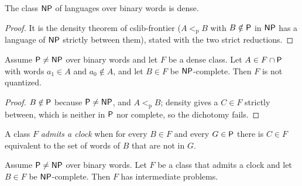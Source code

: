 \begin{theorem}
  \label{thm:structure-denso-np}
  \leanok
  The class $\mathsf{NP}$ of languages over binary words is dense.
\end{theorem}

\begin{proof}
  \leanok
  It is the density theorem of cslib-frontier ($A <_{\mathrm{p}} B$ with $B \notin \mathsf{P}$ in $\mathsf{NP}$ has a
  language of $\mathsf{NP}$ strictly between them), stated with the two strict reductions.
\end{proof}

\begin{theorem}
  \label{thm:structure-denso-no-cuantizado}
  \leanok
  Assume $\mathsf{P} \neq \mathsf{NP}$ over binary words and let $F$ be a dense class. Let $A \in F \cap \mathsf{P}$ with
  words $a_1 \in A$ and $a_0 \notin A$, and let $B \in F$ be $\mathsf{NP}$-complete. Then $F$ is not
  quantized.
  \own{}
\end{theorem}

\begin{proof}
  \leanok
  $B \notin \mathsf{P}$ because $\mathsf{P} \neq \mathsf{NP}$, and $A <_{\mathrm{p}} B$; density gives a $C \in F$ strictly
  between, which is neither in $\mathsf{P}$ nor complete, so the dichotomy fails.
\end{proof}

\begin{definition}
  \label{def:structure-admite-reloj}
  \leanok
  A class $F$ \emph{admits a clock} when for every $B \in F$ and every $G \in \mathsf{P}$ there is $C \in F$
  equivalent to the set of words of $B$ that are not in $G$.
  \own{}
\end{definition}

\begin{theorem}
  \label{thm:structure-medio-reloj}
  \leanok
  Assume $\mathsf{P} \neq \mathsf{NP}$ over binary words. Let $F$ be a class that admits a clock and let $B \in F$ be
  $\mathsf{NP}$-complete. Then $F$ has intermediate problems.
  \own{}
\end{theorem}

